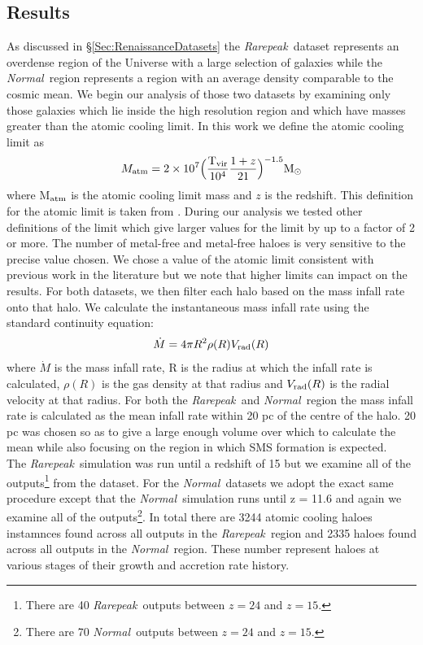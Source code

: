 \documentclass[graphics, twocolumn, usenatbib]{mn2e}
\newcommand{\rarepeak} {\textit{Rarepeak~}}
\newcommand{\normal} {\textit{Normal~}}
\begin{document}
\subsection{Results} \label{Sec:Results}

As discussed in \S \ref{Sec:RenaissanceDatasets} the \rarepeak dataset represents an overdense
region of the Universe with a large selection of galaxies while the \normal region represents a
region with an average density comparable to the cosmic mean. We begin our analysis of those two
datasets by examining only those galaxies which lie inside the high resolution region and which
have masses greater than the atomic cooling limit. In this work we define the atomic cooling
limit as
\begin{equation}
  M_{\rm atm} = 2 \times 10^{7} \Big ( \frac{\rm{T_{vir}}}{10^4}  \frac{1 + z}{21} \Big )^{-1.5} \rm{M_{\odot}}
\end{equation}
where M$_{\rm atm}$ is the atomic cooling limit mass and $z$ is the redshift.
This definition for the atomic limit is taken from \cite{Fernandez_2014}. During our analysis
we tested other definitions of the limit \citep[e.g.][]{Bromm_2011} which give larger
values for the limit by up to a factor of 2 or more. The number of metal-free and metal-free haloes
is very sensitive to the precise value chosen. We chose a value of the atomic limit consistent
with previous work in the literature but we note that higher limits can impact on the results.
For both datasets, we then filter each halo based on the mass infall rate onto that halo.
We calculate the instantaneous mass infall rate using the standard continuity equation:
\begin{equation}  
  \dot{M} = 4 \pi R^2 \rho(R) V_{\rm rad}(R)
\end{equation}
where  $\dot{M}$ is the mass infall rate, R is the radius at which the infall rate is calculated,
$\rho(R)$ is the gas density at that radius and $V_{\rm rad}(R)$ is the radial velocity at that radius.
For both the \rarepeak and \normal region the mass infall rate is calculated as the mean
infall rate within 20 pc of the centre of the halo. 20 pc was chosen so as to give a large enough
volume over which to calculate the mean while also focusing on the region in which SMS formation is
expected. \\
\indent The \rarepeak simulation was run until a redshift of 15 but we
examine all of the outputs\footnote{There are 40 \rarepeak outputs between $z = 24$ and $z = 15$.}
from the dataset. For the \normal datasets we adopt the exact same procedure except that
the \normal simulation runs until z = 11.6 and again we examine all of the
outputs\footnote{There are 70 \normal outputs between $z = 24$ and $z = 15$.}.  In total there are
3244 atomic cooling haloes instamnces found across all outputs in the \rarepeak region and 2335
haloes found across all outputs in the \normal region. These number represent haloes at various stages
of their growth and accretion rate history. 
\end{document}
